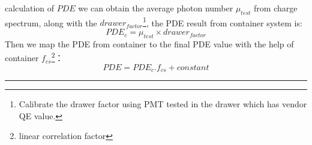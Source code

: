 \documentclass[11pt,compress,xcolor=x11names,UTF8]{beamer}
\begin{document}
%
%
%
\begin{frame}{calculation of $PDE$}
we can obtain the average photon number $\mu_{test}$ from charge spectrum, along with the $drawer_{factor}$\footnote{Calibrate the drawer factor using PMT tested in the drawer which has vendor QE value.}, the PDE result from container system is:
\begin{equation}
PDE_{c}=\mu_{test}\times drawer_{factor}
\end{equation}
Then we map the PDE from container to the final PDE value with the help of container $f_{cs}$\footnote{linear correlation factor}：
\begin{equation}
PDE=PDE_{c}.f_{cs}+constant
\label{pde_formula}
\end{equation}
\vspace{.5cm}
\hrule{\textwidth}
\vspace{.5cm}

\end{frame}
\end{document}

